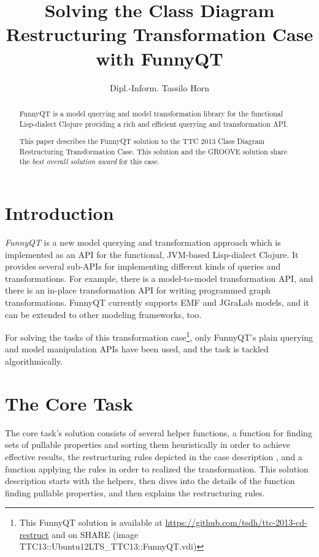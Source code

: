\documentclass[submission]{eptcs}
\title{Solving the Class Diagram Restructuring Transformation Case with FunnyQT}
\author{Dipl.-Inform. Tassilo Horn
  \email{horn@uni-koblenz.de}
  \institute{Institute for Software Technology, University Koblenz-Landau, Germany}}
\begin{document}
\maketitle

\begin{abstract}
  FunnyQT is a model querying and model transformation library for the
  functional Lisp-dialect Clojure providing a rich and efficient querying and
  transformation API.

  This paper describes the FunnyQT solution to the TTC 2013 Class Diagram
  Restructuring Transformation Case.  This solution and the GROOVE solution
  share the \emph{best overall solution award} for this case.
\end{abstract}

\section{Introduction}
\label{sec:introduction}

\emph{FunnyQT} is a new model querying and transformation approach which is
implemented as an API for the functional, JVM-based Lisp-dialect Clojure.  It
provides several sub-APIs for implementing different kinds of queries and
transformations.  For example, there is a model-to-model transformation API,
and there is an in-place transformation API for writing programmed graph
transformations.  FunnyQT currently supports EMF and JGraLab models, and it can
be extended to other modeling frameworks, too.

For solving the tasks of this transformation case\footnote{This FunnyQT
  solution is available at \url{https://github.com/tsdh/ttc-2013-cd-restruct}
  and on SHARE (image
  \textsf{TTC13::Ubuntu12LTS\_TTC13::FunnyQT.vdi})\label{fn:github}}, only
FunnyQT's plain querying and model manipulation APIs have been used, and the
task is tackled algorithmically.


\section{The Core Task}
\label{sec:core-task}

The core task's solution consists of several helper functions, a function for
finding sets of pullable properties and sorting them heuristically in order to
achieve effective results, the restructuring rules depicted in the case
description \cite{cdrestructcasedesc}, and a function applying the rules in
order to realized the transformation.  This solution description starts with
the helpers, then dives into the details of the function finding pullable
properties, and then explains the restructuring rules.
\end{document}
